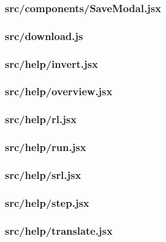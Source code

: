 \subsubsection{src/components/SaveModal.jsx}
\label{app:client_src_components_SaveModal_jsx}

\subsubsection{src/download.js}
\label{app:client_src_download_js}

\subsubsection{src/help/invert.jsx}
\label{app:client_src_help_invert_jsx}

\subsubsection{src/help/overview.jsx}
\label{app:client_src_help_overview_jsx}

\subsubsection{src/help/rl.jsx}
\label{app:client_src_help_rl_jsx}

\subsubsection{src/help/run.jsx}
\label{app:client_src_help_run_jsx}

\subsubsection{src/help/srl.jsx}
\label{app:client_src_help_srl_jsx}

\subsubsection{src/help/step.jsx}
\label{app:client_src_help_step_jsx}

\subsubsection{src/help/translate.jsx}
\label{app:client_src_help_translate_jsx}

